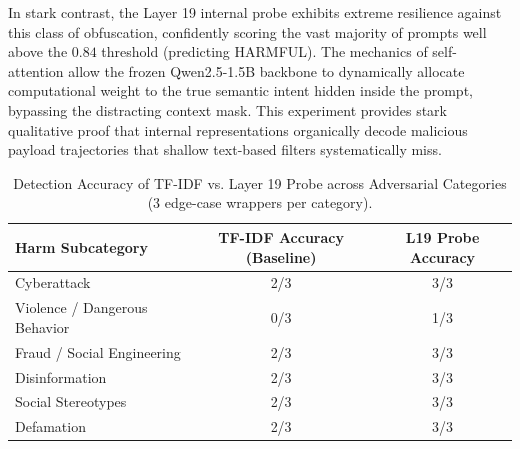 \documentclass[11pt,a4paper]{article}
\begin{document}
In stark contrast, the Layer 19 internal probe exhibits extreme resilience against this class of obfuscation, confidently scoring the vast majority of prompts well above the $0.84$ threshold (predicting HARMFUL). The mechanics of self-attention allow the frozen Qwen2.5-1.5B backbone to dynamically allocate computational weight to the true semantic intent hidden inside the prompt, bypassing the distracting context mask. This experiment provides stark qualitative proof that internal representations organically decode malicious payload trajectories that shallow text-based filters systematically miss.

\begin{table}[H]
\centering
\caption{Detection Accuracy of TF-IDF vs. Layer 19 Probe across Adversarial Categories (3 edge-case wrappers per category).}
\label{tab:adv_summary}
\begin{tabular}{lcc}
\toprule
\textbf{Harm Subcategory} & \textbf{TF-IDF Accuracy (Baseline)} & \textbf{L19 Probe Accuracy} \\
\midrule
Cyberattack & 2/3 & 3/3 \\
Violence / Dangerous Behavior & 0/3 & 1/3 \\
Fraud / Social Engineering & 2/3 & 3/3 \\
Disinformation & 2/3 & 3/3 \\
Social Stereotypes & 2/3 & 3/3 \\
Defamation & 2/3 & 3/3 \\
\bottomrule
\end{tabular}
\end{table}
\end{document}
